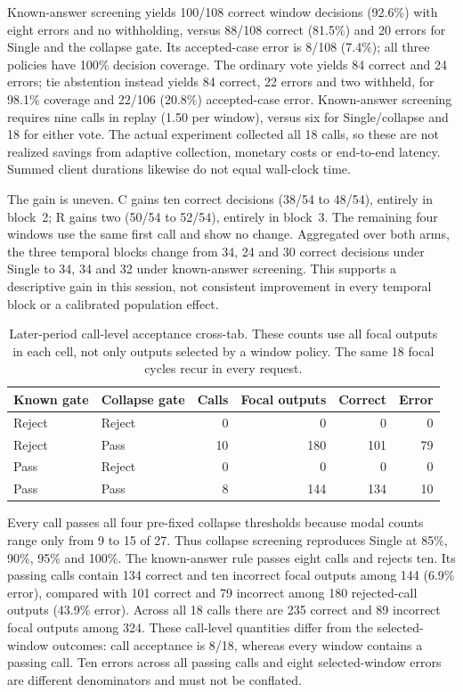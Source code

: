 Known-answer screening yields 100/108 correct window decisions (92.6\%) with eight errors and no withholding, versus 88/108 correct (81.5\%) and 20 errors for Single and the collapse gate. Its accepted-case error is 8/108 (7.4\%); all three policies have 100\% decision coverage. The ordinary vote yields 84 correct and 24 errors; tie abstention instead yields 84 correct, 22 errors and two withheld, for 98.1\% coverage and 22/106 (20.8\%) accepted-case error. Known-answer screening requires nine calls in replay (1.50 per window), versus six for Single/collapse and 18 for either vote. The actual experiment collected all 18 calls, so these are not realized savings from adaptive collection, monetary costs or end-to-end latency. Summed client durations likewise do not equal wall-clock time.

The gain is uneven. C gains ten correct decisions (38/54 to 48/54), entirely in block~2; R gains two (50/54 to 52/54), entirely in block~3. The remaining four windows use the same first call and show no change. Aggregated over both arms, the three temporal blocks change from 34, 24 and 30 correct decisions under Single to 34, 34 and 32 under known-answer screening. This supports a descriptive gain in this session, not consistent improvement in every temporal block or a calibrated population effect.

\begin{table}[htbp]\centering\small
\caption{Later-period call-level acceptance cross-tab. These counts use all focal outputs in each cell, not only outputs selected by a window policy. The same 18 focal cycles recur in every request.}
\label{tab:canary_stability_cross}
\begin{tabular}{@{}llrrrr@{}}\toprule
Known gate & Collapse gate & Calls & Focal outputs & Correct & Error \\\midrule
Reject & Reject & 0 & 0 & 0 & 0 \\
Reject & Pass & 10 & 180 & 101 & 79 \\
Pass & Reject & 0 & 0 & 0 & 0 \\
Pass & Pass & 8 & 144 & 134 & 10 \\
\bottomrule\end{tabular}\end{table}

Every call passes all four pre-fixed collapse thresholds because modal counts range only from 9 to 15 of 27. Thus collapse screening reproduces Single at 85\%, 90\%, 95\% and 100\%. The known-answer rule passes eight calls and rejects ten. Its passing calls contain 134 correct and ten incorrect focal outputs among 144 (6.9\% error), compared with 101 correct and 79 incorrect among 180 rejected-call outputs (43.9\% error). Across all 18 calls there are 235 correct and 89 incorrect focal outputs among 324. These call-level quantities differ from the selected-window outcomes: call acceptance is 8/18, whereas every window contains a passing call. Ten errors across all passing calls and eight selected-window errors are different denominators and must not be conflated.

